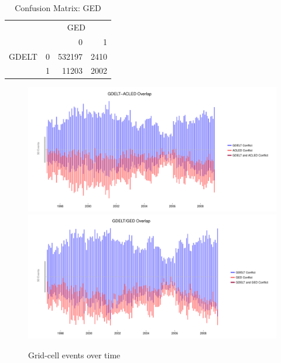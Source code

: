 \documentclass[hidelinks]{article}
\begin{document}
\begin{table}[ht]
\centering
\begin{tabular}{rrrr}
  \hline
 &  \multicolumn{3}{c}{GED}\\
& & 0 & 1 \\ 
  \hline
GDELT & 0 & 532197 & 2410 \\ 
 &  1 & 11203 & 2002 \\ 
   \hline
\end{tabular}
\caption{Confusion Matrix: GED} 
\end{table}


\vfill

\newpage
\begin{figure}[!htbp]
\includegraphics[width = 1 \textwidth]{timeACLEDa2.pdf}\\
\includegraphics[width = 1 \textwidth]{timeGEDa2.pdf}
\caption{Grid-cell events over time}\label{fig:correlations_time}
\end{figure}
\end{document}
